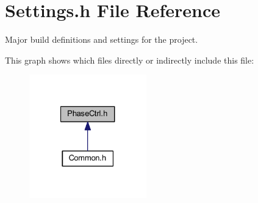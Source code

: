 \hypertarget{a00027}{\section{Settings.\-h File Reference}
\label{a00027}
}


Major build definitions and settings for the project.  


This graph shows which files directly or indirectly include this file\-:
\nopagebreak
\begin{figure}[H]
\begin{center}
\leavevmode
\includegraphics[width=144pt]{a00051}
\end{center}
\end{figure}
